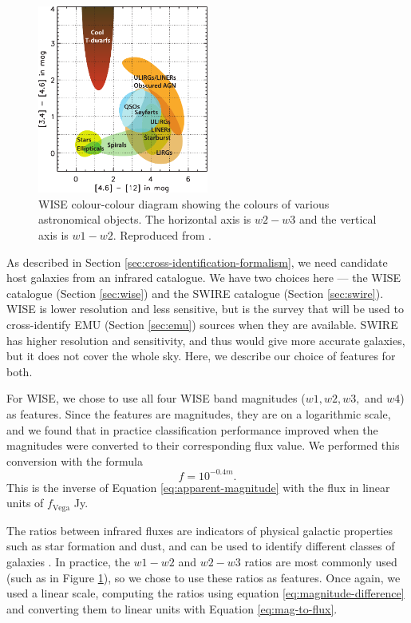     \begin{figure}
      \centering
      \includegraphics[width=0.5\textwidth]{images/wise_colour-colour}
      \caption{WISE colour-colour diagram showing the colours of various
        astronomical objects. The horizontal axis is $w2 - w3$ and the vertical
        axis is $w1 - w2$. Reproduced from \citep{wright10}.}
      \label{fig:wise-colour-colour}
    \end{figure}

    As described in Section \ref{sec:cross-identification-formalism}, we need
    candidate host galaxies from an infrared catalogue. We have two choices here
    --- the WISE catalogue (Section \ref{sec:wise}) and the SWIRE catalogue
    (Section \ref{sec:swire}). WISE is lower resolution and less sensitive, but
    is the survey that will be used to cross-identify EMU (Section
    \ref{sec:emu}) sources when they are available. SWIRE has higher
    resolution and sensitivity, and thus would give more accurate galaxies, but
    it does not cover the whole sky. Here, we describe our choice of features
    for both.

    For WISE, we chose to use all four WISE band magnitudes ($w1, w2, w3,$ and
    $w4$) as features. Since the features are magnitudes, they are on a
    logarithmic scale, and we found that in practice classification performance
    improved when the magnitudes were converted to their corresponding flux
    value. We performed this conversion with the formula
    \begin{equation}
      \label{eq:mag-to-flux}
      f = 10^{-0.4m}.
    \end{equation}
    This is the inverse of Equation \ref{eq:apparent-magnitude} with the flux in
    linear units of $f_{\text{Vega}}$ Jy.

    The ratios between infrared fluxes are indicators of physical galactic
    properties such as star formation and dust, and can be used to identify
    different classes of galaxies \citep{wright10}. In practice, the $w1 - w2$
    and $w2 - w3$ ratios are most commonly used (such as in Figure
    \ref{fig:wise-colour-colour}), so we chose to use these ratios as features.
    Once again, we used a linear scale, computing the ratios using equation
    \ref{eq:magnitude-difference} and converting them to linear units with
    Equation \ref{eq:mag-to-flux}.

